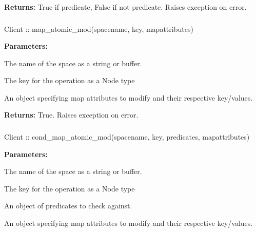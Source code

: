 \noindent\textbf{Returns:}
True if predicate, False if not predicate.  Raises exception on error.

\subsubsection{}
\label{api:nodejs:map_atomic_mod}
\begin{javascriptcode}
Client :: map_atomic_mod(spacename, key, mapattributes)
\end{javascriptcode}
\funcdesc 

\noindent\textbf{Parameters:}
\begin{description}[labelindent=\widthof{{\code{mapattributes}}},leftmargin=*,noitemsep,nolistsep,align=right]
\item[\code{spacename}] The name of the space as a string or buffer.
\item[\code{key}] The key for the operation as a Node type
\item[\code{mapattributes}] An object specifying map attributes to modify and their respective key/values.
\end{description}

\noindent\textbf{Returns:}
True.  Raises exception on error.

\subsubsection{}
\label{api:nodejs:cond_map_atomic_mod}
\begin{javascriptcode}
Client :: cond_map_atomic_mod(spacename, key, predicates, mapattributes)
\end{javascriptcode}
\funcdesc 

\noindent\textbf{Parameters:}
\begin{description}[labelindent=\widthof{{\code{mapattributes}}},leftmargin=*,noitemsep,nolistsep,align=right]
\item[\code{spacename}] The name of the space as a string or buffer.
\item[\code{key}] The key for the operation as a Node type
\item[\code{predicates}] An object of predicates to check against.
\item[\code{mapattributes}] An object specifying map attributes to modify and their respective key/values.
\end{description}

